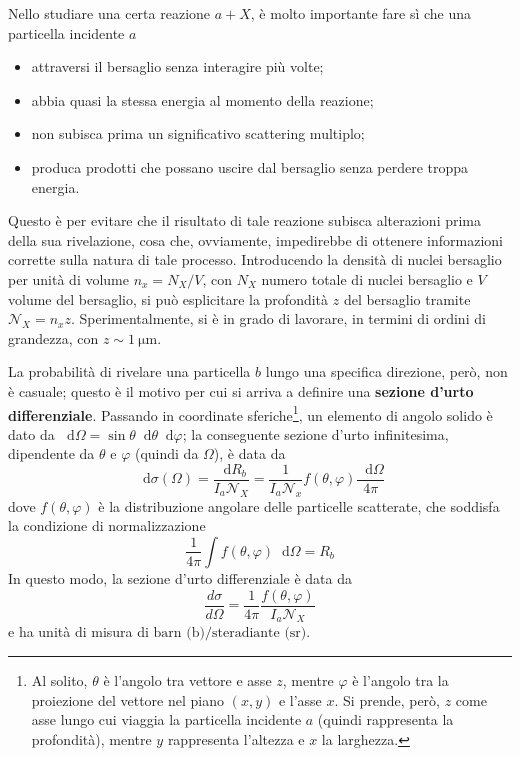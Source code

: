 \documentclass[11pt, a4paper]{scrartcl}
\theoremstyle{style}
\newcommand{\dd}{\mathop{}\!\mathrm{d}}
\numberwithin{equation}{subsection}
\begin{document}
Nello studiare una certa reazione $a+X$, \`e molto importante fare s\`i che una particella incidente $a$
\begin{itemize}
	\item attraversi il bersaglio senza interagire più volte;
	\item abbia quasi la stessa energia al momento della reazione;
	\item non subisca prima un significativo scattering multiplo;
	\item produca prodotti che possano uscire dal bersaglio senza perdere troppa energia.
\end{itemize}
Questo \`e per evitare che il risultato di tale reazione subisca alterazioni prima della sua rivelazione, cosa che, ovviamente, impedirebbe di ottenere informazioni corrette sulla natura di tale processo.
Introducendo la densit\`a di nuclei bersaglio per unit\`a di volume $n_x = N_X / V$, con $N_X$ numero totale di nuclei bersaglio e $V$ volume del bersaglio, si pu\`o esplicitare la profondit\`a $z$ del bersaglio tramite $\mathcal{N} _X = n_x z$.
Sperimentalmente, si \`e in grado di lavorare, in termini di ordini di grandezza, con $z \sim 1\ \mathrm{ \mu m} $.

La probabilit\`a di rivelare una particella $b$ lungo una specifica direzione, per\`o, non \`e casuale; questo \`e il motivo per cui si arriva a definire una \textbf{sezione d'urto differenziale}.
Passando in coordinate sferiche\footnote{Al solito, $\theta $ \`e l'angolo tra vettore e asse $z$, mentre $\varphi $ \`e l'angolo tra la proiezione del vettore nel piano $(x,y)$ e l'asse $x$. Si prende, per\`o, $z$ come asse lungo cui viaggia la particella incidente $a$ (quindi rappresenta la profondit\`a), mentre $y$ rappresenta l'altezza e $x$ la larghezza.}, un elemento di angolo solido \`e dato da $\dd \Omega  = \sin \theta  \dd \theta \dd \varphi $; la conseguente sezione d'urto infinitesima, dipendente da $\theta $ e $\varphi $ (quindi da $\Omega $), \`e data da
\[
\dd \sigma (\Omega ) = \frac{\dd R_b}{I_a \mathcal{N} _X} = \frac{1}{I_a \mathcal{N} _x} f(\theta ,\varphi ) \frac{\dd \Omega }{4\pi}
\] 
dove $f(\theta ,\varphi )$ \`e la distribuzione angolare delle particelle scatterate, che soddisfa la condizione di normalizzazione
\[
\frac{1}{4\pi} \int f(\theta ,\varphi ) \dd \Omega  = R_b
\] 
In questo modo, la sezione d'urto differenziale \`e data da 
\begin{equation}
	\frac{d \sigma }{d \Omega }  = \frac{1}{4\pi} \frac{f(\theta ,\varphi )}{I_a \mathcal{N} _X} 
\end{equation}
e ha unit\`a di misura di $\text{barn (b)}/\text{steradiante (sr)}$.
\end{document}
